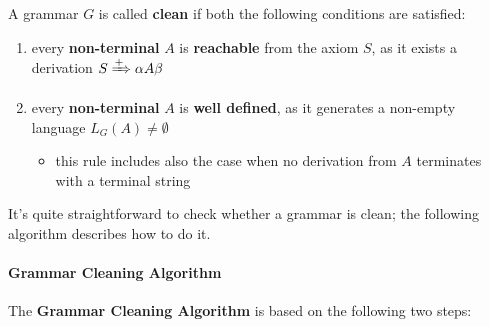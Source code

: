 \documentclass[english]{article}
\begin{document}
\begin{definition}
  \label{def:clean-grammar}
  A grammar \(G\) is called \textbf{clean} if both the following conditions are satisfied:

  \begin{enumerate}
    \item every \textbf{non-terminal} \(A\) is \textbf{reachable} from the axiom \(S\), as it exists a derivation \(S \xRightarrow{+} \alpha A \beta\)
    \item every \textbf{non-terminal} \(A\) is \textbf{well defined}, as it generates a non-empty language \(L_G(A) \neq \emptyset\)
          \begin{itemize}[label=\(\rightarrow\)]
            \item this rule includes also the case when no derivation from \(A\) terminates with a terminal string
          \end{itemize}
  \end{enumerate}
\end{definition}

It's quite straightforward to check whether a grammar is clean;
the following algorithm describes how to do it.

\paragraph{Grammar Cleaning Algorithm}

The \textbf{Grammar Cleaning Algorithm} is based on the following two steps:
\end{document}
